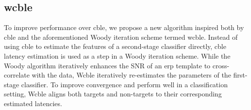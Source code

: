 \subsection{\acl{wcble}}
To improve performance over \ac{cble}, we propose a new algorithm inspired both by
\ac{cble} and the aforementioned Woody iteration scheme termed \ac{wcble}.
Instead of using \ac{cble} to estimate the features of a second-stage classifier
directly, \ac{cble} latency estimation is used as a step in a Woody iteration scheme.
While the Woody algorithm iteratively enhances the SNR of an \ac{erp} template to
cross-correlate with the data, W\ac{cble} iteratively re-estimates the parameters of
the first-stage classifier.
To improve convergence and perform well in a classification setting, W\ac{cble}
aligns both targets and non-targets to their corresponding estimated latencies.

